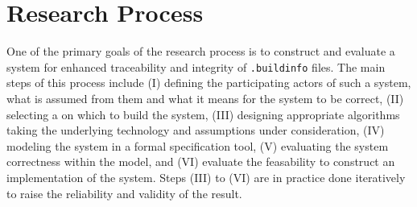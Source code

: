 \documentclass[english, biblatex, digitaloutput]{kththesis}
\begin{document}

\section{Research Process}
\label{sec:researchProcess}






One of the primary goals of the research process is to construct and evaluate a system for enhanced traceability and integrity of \texttt{.buildinfo} files. The main steps of this process include (I) defining the participating actors of such a system, what is assumed from them and what it means for the system to be correct, (II) selecting a  on which to build the system, (III) designing appropriate algorithms taking the underlying technology and assumptions under consideration, (IV) modeling the system in a formal specification tool, (V) evaluating the system correctness within the model, and (VI) evaluate the feasability to construct an implementation of the system. Steps (III) to (VI) are in practice done iteratively to raise the reliability and validity of the result.
\end{document}
